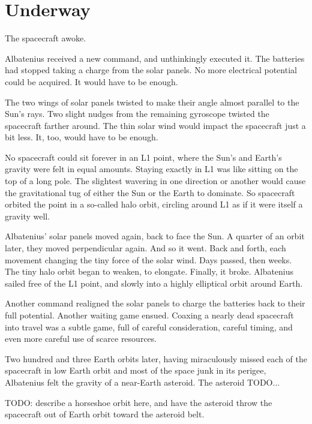 %
%

\chapter{Underway}

The spacecraft awoke.

Albatenius received a new command, and unthinkingly executed it. The batteries had stopped taking a charge from the solar panels. No more electrical potential could be acquired. It would have to be enough.

The two wings of solar panels twisted to make their angle almost parallel to the Sun's rays. Two slight nudges from the remaining gyroscope twisted the spacecraft farther around. The thin solar wind would impact the spacecraft just a bit less. It, too, would have to be enough.

No spacecraft could sit forever in an L1 point, where the Sun's and Earth's gravity were felt in equal amounts. Staying exactly in L1 was like sitting on the top of a long pole. The slightest wavering in one direction or another would cause the gravitational tug of either the Sun or the Earth to dominate. So spacecraft orbited the point in a so-called halo orbit, circling around L1 as if it were itself a gravity well.

Albatenius' solar panels moved again, back to face the Sun. A quarter of an orbit later, they moved perpendicular again. And so it went. Back and forth, each movement changing the tiny force of the solar wind. Days passed, then weeks. The tiny halo orbit began to weaken, to elongate. Finally, it broke. Albatenius sailed free of the L1 point, and slowly into a highly elliptical orbit around Earth.

Another command realigned the solar panels to charge the batteries back to their full potential. Another waiting game ensued. Coaxing a nearly dead spacecraft into travel was a subtle game, full of careful consideration, careful timing, and even more careful use of scarce resources.

Two hundred and three Earth orbits later, having miraculously missed each of the spacecraft in low Earth orbit and most of the space junk in its perigee, Albatenius felt the gravity of a near-Earth asteroid. The asteroid TODO...

TODO: describe a horseshoe orbit here, and have the asteroid throw the spacecraft out of Earth orbit toward the asteroid belt.

\newpage
\thispagestyle{empty}
